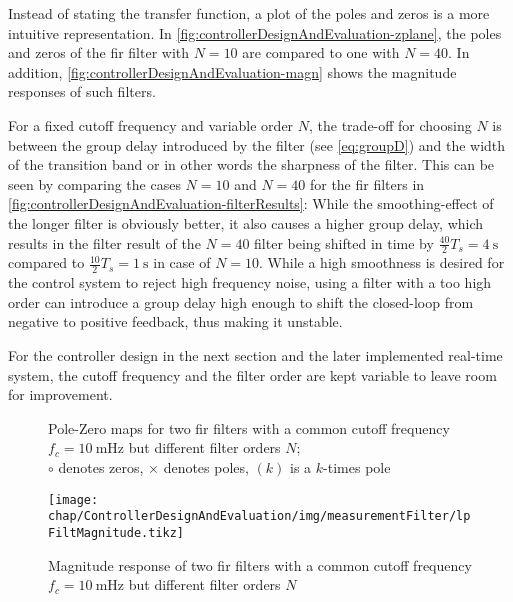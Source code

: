 Instead of stating the transfer function, a plot of the poles and zeros is a more intuitive representation. In \autoref{fig:controllerDesignAndEvaluation-zplane}, the poles and zeros of the \gls{fir} filter with $N=10$ are compared to one with $N=40$. In addition, \autoref{fig:controllerDesignAndEvaluation-magn} shows the magnitude responses of such filters.

For a fixed cutoff frequency and variable order $N$, the trade-off for choosing $N$ is between the group delay introduced by the filter (see \autoref{eq:groupD}) and the width of the transition band or in other words the sharpness of the filter. This can be seen by comparing the cases $N=10$ and $N=40$ for the \gls{fir} filters in \autoref{fig:controllerDesignAndEvaluation-filterResults}: While the smoothing-effect of the longer filter is obviously better, it also causes a higher group delay, which results in the filter result of the $N=40$ filter being shifted in time by $\frac{40}{2}T_s = \SI{4}{\second}$ compared to $\frac{10}{2}T_s = \SI{1}{\second}$ in case of $N=10$. While a high smoothness is desired for the control system to reject high frequency noise, using a filter with a too high order can introduce a group delay high enough to shift the closed-loop from negative to positive feedback, thus making it unstable.

For the controller design in the next section and the later implemented real-time system, the cutoff frequency and the filter order are kept variable to leave room for improvement.

\begin{figure}[tb]
    \centering
        \subfloat[$N=10$]{}
        \qquad
        \subfloat[$N=40$]{}
       \caption{Pole-Zero maps for two \gls{fir} filters with a common cutoff frequency $f_c=\SI{10}{\milli\hertz}$ but different filter orders $N$;\\ $\circ$ denotes zeros, $\times$ denotes poles, $(k)$ is a $k$-times pole}
    \label{fig:controllerDesignAndEvaluation-zplane}
\end{figure}

\begin{figure}[tb]
	\centering
	\texttt{[image: chap/ControllerDesignAndEvaluation/img/measurementFilter/lpFiltMagnitude.tikz]}
	\caption{Magnitude response of two \gls{fir} filters with a common cutoff frequency $f_c=\SI{10}{\milli\hertz}$ but different filter orders $N$}
	\label{fig:controllerDesignAndEvaluation-magn}
\end{figure}

